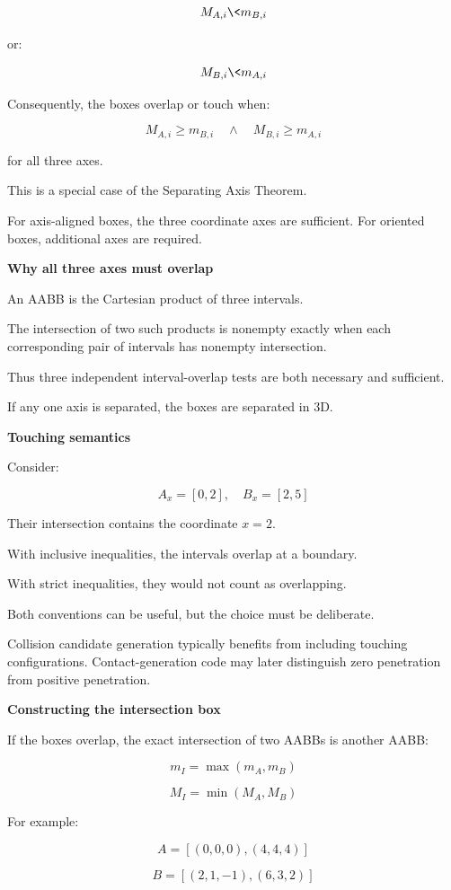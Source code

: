 \[
M_{A,i}\<m_{B,i}
\]

or:

\[
M_{B,i}\<m_{A,i}
\]

Consequently, the boxes overlap or touch when:

\[
\boxed{ M_{A,i}\ge m_{B,i} \quad\land\quad M_{B,i}\ge m_{A,i} }
\]

for all three axes.

This is a special case of the Separating Axis Theorem.

For axis-aligned boxes, the three coordinate axes are sufficient. For oriented boxes, additional axes are required.

\textbf{Why all three axes must overlap}

An AABB is the Cartesian product of three intervals.

The intersection of two such products is nonempty exactly when each corresponding pair of intervals has nonempty intersection.

Thus three independent interval-overlap tests are both necessary and sufficient.

If any one axis is separated, the boxes are separated in 3D.

\textbf{Touching semantics}

Consider:

\[
A_x=[0,2],\quad B_x=[2,5]
\]

Their intersection contains the coordinate \(x=2\).

With inclusive inequalities, the intervals overlap at a boundary.

With strict inequalities, they would not count as overlapping.

Both conventions can be useful, but the choice must be deliberate.

Collision candidate generation typically benefits from including touching configurations. Contact-generation code may later distinguish zero penetration from positive penetration.

\textbf{Constructing the intersection box}

If the boxes overlap, the exact intersection of two AABBs is another AABB:

\[
\boxed{ m_I=\max(m_A,m_B) }
\]

\[
\boxed{ M_I=\min(M_A,M_B) }
\]

For example:

\[
A=[(0,0,0),(4,4,4)]
\]

\[
B=[(2,1,-1),(6,3,2)]
\]

